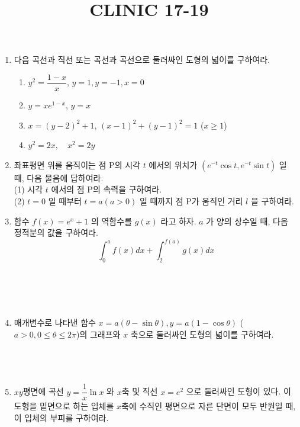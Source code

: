 \documentclass[12pt, a4paper]{article}
\title{CLINIC 17-19}
\begin{document}
\maketitle
\date{}

\begin{enumerate}
\item 다음 곡선과 직선 또는 곡선과 곡선으로 둘러싸인 도형의 넓이를 구하여라. 
   \begin{enumerate}[label=(\arabic*)] 
    \item $y^2 = \dfrac{1-x}{x}$, $y=1, y=-1, x=0$
    \item $y=xe^{1-x}$, $y=x$
    \item $x=(y-2)^2+1$, $(x-1)^2+(y-1)^2=1$ ($x \ge 1$)
    \item $y^2 = 2x, \quad x^2 = 2y$
   \end{enumerate} 


\item 좌표평면 위를 움직이는 점 P의 시각 $t$ 에서의 위치가 $(e^{-t} \cos t, e^{-t} \sin t)$ 일 때, 다음 물음에 답하여라. \\
   (1) 시각 $t$ 에서의 점 P의 속력을 구하여라.\\
   (2) $t=0$ 일 때부터 $t=a(a > 0)$ 일 때까지 점 P가 움직인 거리 $l$ 을 구하여라.\\


\item 함수 $f(x)=e^x+1$ 의 역함수를 $g(x)$ 라고 하자. $a$ 가 양의 상수일 때, 다음 정적분의 값을 구하여라.
\[ \int_0^a f(x) dx + \int_2^{f(a)} g(x) dx \] \\ \\ \\ \\


\item 매개변수로 나타낸 함수 $x=a(\theta - \sin \theta), y=a(1 - \cos \theta)$ ($a>0, 0 \le \theta \le 2\pi$)의 그래프와 $x$ 축으로 둘러싸인 도형의 넓이를 구하여라. \\ \\ \\ \\


\item $xy$평면에 곡선 $y = \dfrac{1}{x} \ln x$ 와 $x$축 및 직선 $x = e^2$ 으로 둘러싸인 도형이 있다. 이 도형을 밑면으로 하는 입체를 $x$축에 수직인 평면으로 자른 단면이 모두 반원일 때, 이 입체의 부피를 구하여라. \\ \\ \\ \\



\end{enumerate}
\end{document}
